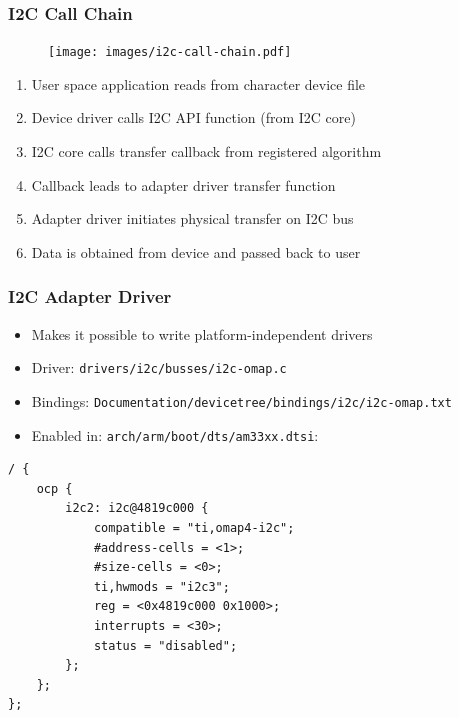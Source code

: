 \documentclass[aspectratio=169,usenames,dvipsnames]{beamer}
\newcounter{cont}
\begin{document}
\begin{frame}
  \frametitle{I2C Call Chain}
  \begin{figure}
    \centering
    \texttt{[image: images/i2c-call-chain.pdf]}
  \end{figure}
  \begin{enumerate}
    \item User space application reads from character device file
    \item Device driver calls I2C API function (from I2C core)
    \item I2C core calls transfer callback from registered algorithm
    \item Callback leads to adapter driver transfer function
    \item Adapter driver initiates physical transfer on I2C bus
    \item Data is obtained from device and passed back to user
  \end{enumerate}
\end{frame}

\begin{frame}[containsverbatim]
  \frametitle{I2C Adapter Driver}
  \begin{itemize}
    \item Makes it possible to write \alert{platform-independent} drivers
    \item Driver: \texttt{drivers/i2c/busses/i2c-omap.c}
    \item Bindings: \texttt{Documentation/devicetree/bindings/i2c/i2c-omap.txt}
    \item Enabled in: \texttt{arch/arm/boot/dts/am33xx.dtsi}:
  \end{itemize}
  \begin{lstlisting}
/ {
	ocp {
		i2c2: i2c@4819c000 {
			compatible = "ti,omap4-i2c";
			#address-cells = <1>;
			#size-cells = <0>;
			ti,hwmods = "i2c3";
			reg = <0x4819c000 0x1000>;
			interrupts = <30>;
			status = "disabled";
		};
	};
};
  \end{lstlisting}
  \vspace*{-12mm}
\end{frame}
\end{document}

